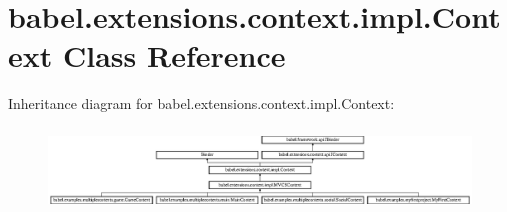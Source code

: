 \hypertarget{classbabel_1_1extensions_1_1context_1_1impl_1_1_context}{\section{babel.\-extensions.\-context.\-impl.\-Context Class Reference}
\label{classbabel_1_1extensions_1_1context_1_1impl_1_1_context}
}
Inheritance diagram for babel.\-extensions.\-context.\-impl.\-Context\-:\begin{figure}[H]
\begin{center}
\leavevmode
\includegraphics[height=2.208202cm]{classbabel_1_1extensions_1_1context_1_1impl_1_1_context}
\end{center}
\end{figure}
